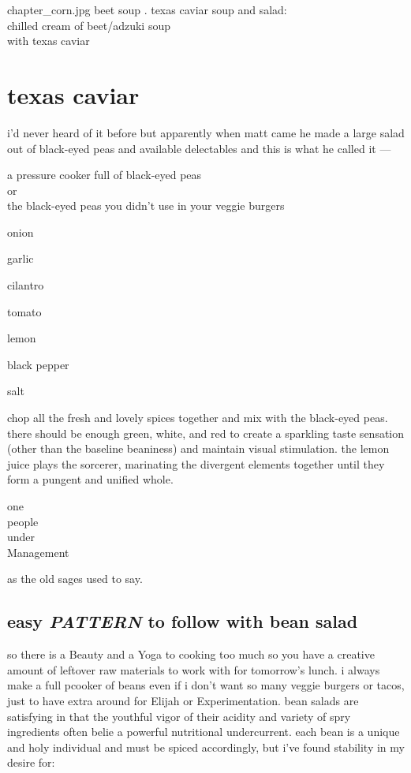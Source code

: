 \mychapter
{chapter_corn.jpg}
{beet soup . texas caviar}
{soup and salad:\\
chilled cream of beet/adzuki soup\\
with texas caviar}

\section{texas caviar}

i'd never heard of it before but apparently when matt came he made a
large salad out of black-eyed peas and available delectables and this
is what he called it ---

\begin{ingredients}
  \item a pressure cooker full of black-eyed peas\\
  \textrm{or}\\
  the black-eyed peas you didn't use in your veggie burgers
  \item onion
  \item garlic
  \item cilantro
  \item tomato
  \item lemon
  \item black pepper
  \item salt
\end{ingredients}

chop all the fresh and lovely spices together and mix with the
black-eyed peas. there should be enough green, white, and red to
create a sparkling taste sensation (other than the baseline beaniness)
and maintain visual stimulation. the lemon juice plays the sorcerer,
marinating the divergent elements together until they form a pungent
and unified whole.

one\\
people\\
under\\
Management

as the old sages used to say.

\subsection{easy \textit{PATTERN} to follow with bean salad}

so there is a Beauty and a Yoga to cooking too much so you have a
creative amount of leftover raw materials to work with for tomorrow's
lunch. i always make a full pcooker of beans even if i don't want so
many veggie burgers or tacos, just to have extra around for Elijah or
Experimentation. bean salads are satisfying in that the youthful vigor
of their acidity and variety of spry ingredients often belie a
powerful nutritional undercurrent. each bean is a unique and holy
individual and must be spiced accordingly, but i've found stability in
my desire for:

